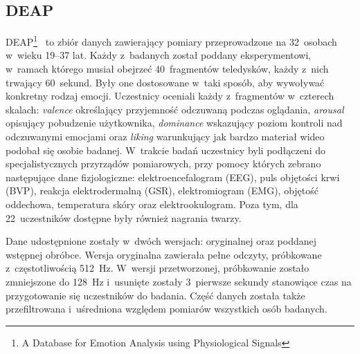 \subsection{DEAP}
DEAP\footnote{A Database for Emotion Analysis using Physiological Signals}~\cite{deap_dataset_2011} to zbiór danych zawierający pomiary przeprowadzone na 32~osobach w~wieku 19--37 lat. Każdy z~badanych został poddany eksperymentowi, w~ramach którego musiał obejrzeć 40~fragmentów teledysków, każdy z~nich trwający 60~sekund. Były one dostosowane w~taki sposób, aby wywoływać konkretny rodzaj emocji. Uczestnicy oceniali każdy z~fragmentów w~czterech skalach: \textit{valence} określający przyjemność odczuwaną podczas oglądania, \textit{arousal} opisujący pobudzenie użytkownika, \textit{dominance} wskazujący poziom kontroli nad odczuwanymi emocjami oraz \textit{liking} warunkujący jak bardzo materiał wideo podobał się osobie badanej. W~trakcie badań uczestnicy byli podłączeni do specjalistycznych przyrządów pomiarowych, przy pomocy których zebrano następujące dane fizjologiczne: elektroencefalogram (EEG), puls objętości krwi (BVP), reakcja elektrodermalną (GSR), elektromiogram (EMG), objętość oddechowa, temperatura skóry oraz elektrookulogram. Poza tym, dla 22~uczestników dostępne były również nagrania twarzy. 

Dane udostępnione zostały w~dwóch wersjach: oryginalnej oraz poddanej wstępnej obróbce. Wersja oryginalna zawierała pełne odczyty, próbkowane z~częstotliwością 512~Hz. W~wersji przetworzonej, próbkowanie zostało zmniejszone do 128~Hz i~usunięte zostały 3~pierwsze sekundy stanowiące czas na przygotowanie się uczestników do badania. Część danych została także przefiltrowana i~uśredniona względem pomiarów wszystkich osób badanych.

